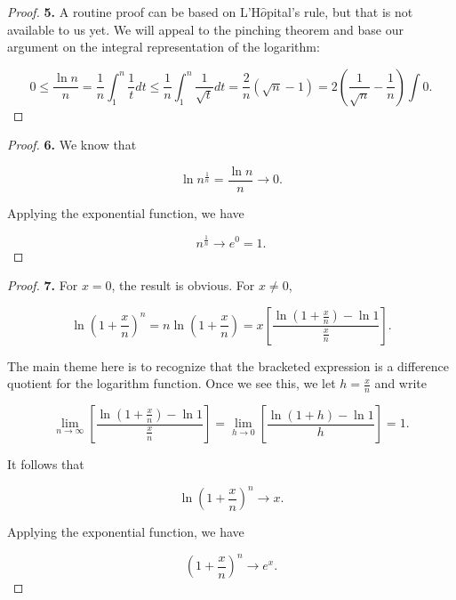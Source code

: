         \begin{proof}
            \textbf{5.} A routine proof can be based on L'H$\hat{o}$pital's rule, but that is not available to us yet. We will appeal to the pinching theorem and base our argument on the integral representation of the
            logarithm:

            \[
                0 \leq \frac{\ln{n}}{n} = \frac{1}{n}\int_1^n \frac{1}{t}dt\leq \frac{1}{n} \int_1^n \frac{1}{\sqrt{t}}dt = \frac{2}{n}(\sqrt{n} - 1) = 2 \left(\frac{1}{\sqrt{n}} - \frac{1}{n}\right) \int 0.
            \]
        \end{proof}

        \begin{proof}
            \textbf{6.} We know that

            \[
                \ln{n^{\frac{1}{n}}} = \frac{\ln{n}}{n} \to 0.
            \]

            Applying the exponential function, we have

            \[
                n^{\frac{1}{n}} \to e^0 = 1.
            \]
        \end{proof}

        \begin{proof}
            \textbf{7.} For $x=0$, the result is obvious. For $x\not = 0$,

            \[
                \ln{\left(1+\frac{x}{n}\right)^n}   = n\ln{\left(1+\frac{x}{n}\right)} = x\left[\frac{\ln{\left(1+\frac{x}{n}\right) - \ln{1}}}{\frac{x}{n}}\right].
            \]

            The main theme here is to recognize that the bracketed expression is a difference quotient for the logarithm function. Once we see this, we let $h = \frac{x}{n}$ and write

            \[
                \lim_{n\to \infty} \left[\frac{\ln{\left(1+\frac{x}{n}\right) - \ln{1}}}{\frac{x}{n}}\right] = \lim_{h\to 0} \left[\frac{\ln{\left(1+h\right)}-\ln{1}}{h}\right] = 1.
            \]

            It follows that

            \[
                \ln{\left(1+\frac{x}{n}\right)}^n \to x.
            \]

            Applying the exponential function, we have

            \[
                \left(1+\frac{x}{n}\right)^n \to e^x.
            \]
        \end{proof}


